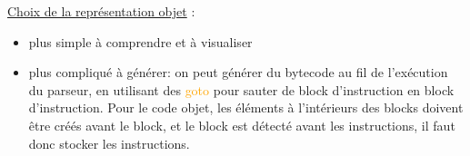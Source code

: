 \documentclass[a4paper]{article}
\begin{document}
\underline{Choix de la représentation objet} :
\begin{itemize}
\item plus simple à comprendre et à visualiser
\item plus compliqué à générer: on peut générer du bytecode au fil de l'exécution du parseur, en utilisant des \textcolor{orange}{goto} pour sauter de block d'instruction en block d'instruction. Pour le code objet, les éléments à l'intérieurs des blocks doivent être créés avant le block, et le block est détecté avant les instructions, il faut donc stocker les instructions.
\end{itemize}


\clearpage{}

\printbibliography[keyword={paper},title={Biliographie}]
\printbibliography[keyword={web},title={Webographie}]
\end{document}
